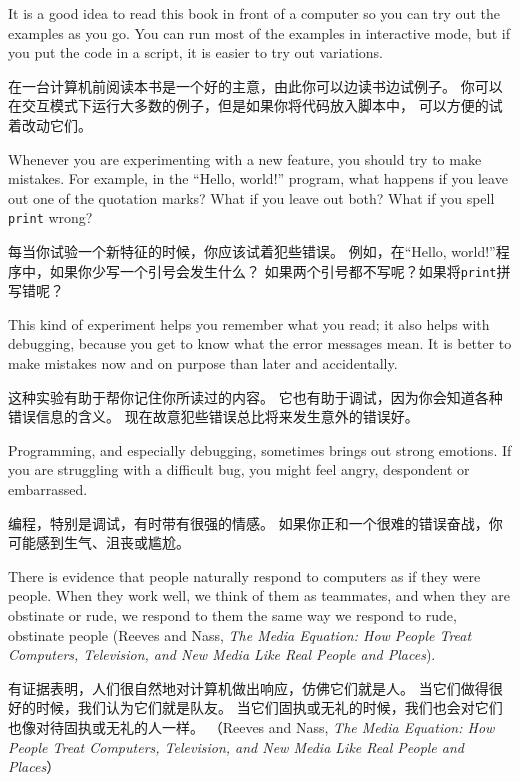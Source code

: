 \documentclass[10pt]{book}
\begin{document}
\begin{CJK}{UTF8}{gbsn}
It is a good idea to read this book in front of a computer so you can
try out the examples as you go.  You can run most of the examples in
interactive mode, but if you put the code in a script, it is easier
to try out variations.

在一台计算机前阅读本书是一个好的主意，由此你可以边读书边试例子。
你可以在交互模式下运行大多数的例子，但是如果你将代码放入脚本中，
可以方便的试着改动它们。

Whenever you are experimenting with a new feature, you should try
to make mistakes.  For example, in the ``Hello, world!'' program,
what happens if you leave out one of the quotation marks?  What
if you leave out both?  What if you spell {\tt print} wrong?

每当你试验一个新特征的时候，你应该试着犯些错误。
例如，在``Hello, world!''程序中，如果你少写一个引号会发生什么？
如果两个引号都不写呢？如果将{\tt print}拼写错呢？

This kind of experiment helps you remember what you read; it also helps
with debugging, because you get to know what the error messages mean.
It is better to make mistakes now and on purpose than later
and accidentally.

这种实验有助于帮你记住你所读过的内容。
它也有助于调试，因为你会知道各种错误信息的含义。
现在故意犯些错误总比将来发生意外的错误好。

Programming, and especially debugging, sometimes brings out strong
emotions.  If you are struggling with a difficult bug, you might 
feel angry, despondent or embarrassed.

编程，特别是调试，有时带有很强的情感。
如果你正和一个很难的错误奋战，你可能感到生气、沮丧或尴尬。

There is evidence that people naturally respond to computers as if
they were people.  When they work well, we think
of them as teammates, and when they are obstinate or rude, we
respond to them the same way we respond to rude,
obstinate people (Reeves and Nass, {\it The Media
    Equation: How People Treat Computers, Television, and New Media
    Like Real People and Places}).

有证据表明，人们很自然地对计算机做出响应，仿佛它们就是人。
当它们做得很好的时候，我们认为它们就是队友。
当它们固执或无礼的时候，我们也会对它们也像对待固执或无礼的人一样。
（Reeves and Nass, {\it The Media Equation: 
How People Treat Computers, Television, and New Media 
Like Real People and Places}）


\end{CJK}
\end{document}
